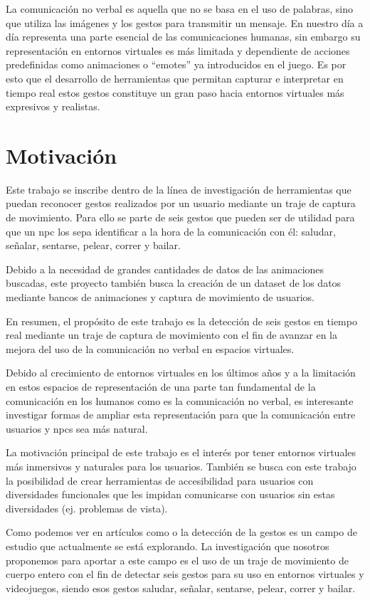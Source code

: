 La comunicación no verbal es aquella que no se basa en el uso de palabras, sino que utiliza las imágenes y los gestos para transmitir un mensaje.
En nuestro día a día representa una parte esencial de las comunicaciones humanas, sin embargo su representación en entornos virtuales es más limitada y dependiente de acciones predefinidas como animaciones o ``emotes'' ya introducidos en el juego.
Es por esto que el desarrollo de herramientas que permitan capturar e interpretar en tiempo real estos gestos constituye un gran paso hacia entornos virtuales más expresivos y realistas.


\section{Motivación}
Este trabajo se inscribe dentro de la línea de investigación de herramientas que puedan reconocer gestos realizados por un usuario mediante un traje de captura de movimiento.
Para ello se parte de seis gestos que pueden ser de utilidad para que un \gls{npc} los sepa identificar a la hora de la comunicación con él: saludar, señalar, sentarse, pelear, correr y bailar.

Debido a la necesidad de grandes cantidades de datos de las animaciones buscadas, este proyecto también busca la creación de un dataset de los datos mediante bancos de animaciones y captura de movimiento de usuarios.

En resumen, el propósito de este trabajo es la detección de seis gestos en tiempo real mediante un traje de captura de movimiento con el fin de avanzar en la mejora del uso de la comunicación no verbal en espacios virtuales.

Debido al crecimiento de entornos virtuales en los últimos años y a la limitación en estos espacios de representación de una parte tan fundamental de la comunicación en los humanos como es la comunicación no verbal, es interesante investigar formas de ampliar esta representación para que la comunicación entre usuarios y \glspl{npc} sea más natural.

La motivación principal de este trabajo es el interés por tener entornos virtuales más inmersivos y naturales para los usuarios. También se busca con este trabajo la posibilidad de crear herramientas de accesibilidad para usuarios con diversidades funcionales que les impidan comunicarse con usuarios sin estas diversidades (ej. problemas de vista).



Como podemos ver en artículos como \cite{Neverova} o \cite{VRHANDS} la detección de la gestos es un campo de estudio que actualmente se está explorando.
La investigación que nosotros proponemos para aportar a este campo es el uso de un traje de movimiento de cuerpo entero con el fin de detectar seis gestos para su uso en entornos virtuales y videojuegos, siendo esos gestos saludar, señalar, sentarse, pelear, correr y bailar.

